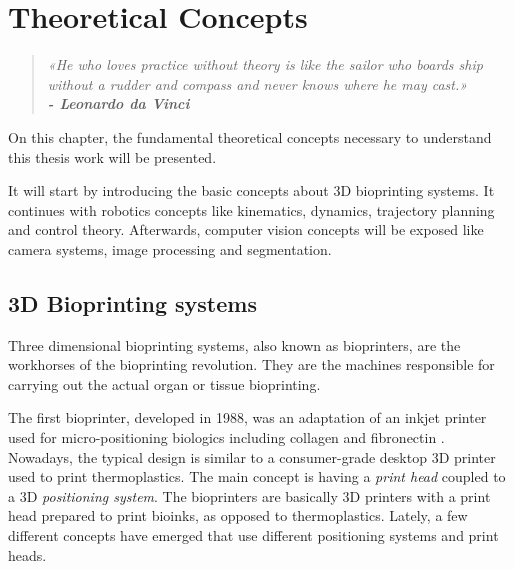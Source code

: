 \chapter{Theoretical Concepts}
\label{cha:theoretical_concepts}

\begin{quotation}
\begin{flushright}
\itshape
«He who loves practice without theory is like the sailor who boards ship without a rudder and compass and never knows where he may cast.»\\
\textbf{- Leonardo da Vinci}
\end{flushright}
\end{quotation}

On this chapter, the fundamental theoretical concepts necessary to understand this thesis work will be presented.

It will start by introducing the basic concepts about 3D bioprinting systems. It continues with robotics concepts like kinematics, dynamics, trajectory planning and control theory. Afterwards, computer vision concepts will be exposed like camera systems, image processing and segmentation.


\section{3D Bioprinting systems}
\label{sec:3d_bioprinting_systems}

Three dimensional bioprinting systems, also known as bioprinters, are the workhorses of the bioprinting revolution. They are the machines responsible for carrying out the actual organ or tissue bioprinting. 

The first bioprinter, developed in 1988, was an adaptation of an inkjet printer used for micro-positioning biologics including collagen and fibronectin \cite{Klebe1988_first_bioprinter}. Nowadays, the typical design is similar to a consumer-grade desktop 3D printer used to print thermoplastics. The main concept is having a \emph{print head} coupled to a 3D \emph{positioning system}. The bioprinters are basically 3D printers with a print head prepared to print bioinks, as opposed to thermoplastics. Lately, a few different concepts have emerged that use different positioning systems and print heads. 

